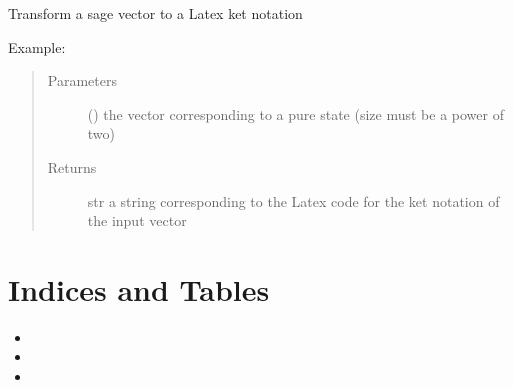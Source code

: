 \documentclass[letterpaper,10pt,english]{sphinxmanual}
\begin{document}

\begin{fulllineitems}
\label{\detokenize{vector_to_ket:vector_to_ket.vector_to_ket}}
Transform a sage vector to a Latex ket notation
\begin{description}
\item[{Example:}] \leavevmode
{}%
\begin{sphinxVerbatim}[commandchars=\\\{\},formatcom=\footnotesize]
  \PYG{p}{[}\PYG{p}{]}
\end{sphinxVerbatim}

\end{description}
\begin{quote}\begin{description}
\item[{Parameters}] \leavevmode
{} () \textendash{} the vector corresponding to a pure state (size must be a power of 
two)

\item[{Returns}] \leavevmode
str \textendash{} a string corresponding to the Latex code for the ket 
notation of the input vector

\end{description}\end{quote}

\end{fulllineitems}



\chapter{Indices and Tables}
\label{\detokenize{index:indices-and-tables}}\begin{itemize}
\item {} 

\item {} 

\item {} 

\end{itemize}
\end{document}
